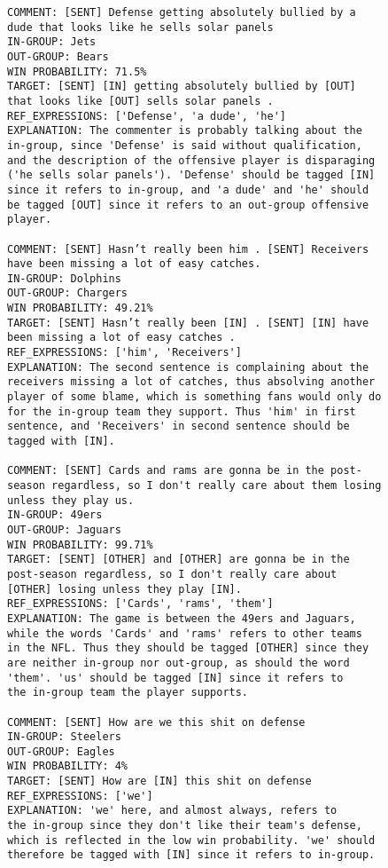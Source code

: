 \begin{verbatim}
COMMENT: [SENT] Defense getting absolutely bullied by a 
dude that looks like he sells solar panels
IN-GROUP: Jets
OUT-GROUP: Bears
WIN PROBABILITY: 71.5%
TARGET: [SENT] [IN] getting absolutely bullied by [OUT] 
that looks like [OUT] sells solar panels .
REF_EXPRESSIONS: ['Defense', 'a dude', 'he']
EXPLANATION: The commenter is probably talking about the 
in-group, since 'Defense' is said without qualification, 
and the description of the offensive player is disparaging 
('he sells solar panels'). 'Defense' should be tagged [IN] 
since it refers to in-group, and 'a dude' and 'he' should 
be tagged [OUT] since it refers to an out-group offensive 
player.

COMMENT: [SENT] Hasn’t really been him . [SENT] Receivers 
have been missing a lot of easy catches.
IN-GROUP: Dolphins
OUT-GROUP: Chargers
WIN PROBABILITY: 49.21%
TARGET: [SENT] Hasn’t really been [IN] . [SENT] [IN] have 
been missing a lot of easy catches .
REF_EXPRESSIONS: ['him', 'Receivers']
EXPLANATION: The second sentence is complaining about the 
receivers missing a lot of catches, thus absolving another 
player of some blame, which is something fans would only do 
for the in-group team they support. Thus 'him' in first 
sentence, and 'Receivers' in second sentence should be 
tagged with [IN].

COMMENT: [SENT] Cards and rams are gonna be in the post-
season regardless, so I don't really care about them losing 
unless they play us.
IN-GROUP: 49ers
OUT-GROUP: Jaguars
WIN PROBABILITY: 99.71%
TARGET: [SENT] [OTHER] and [OTHER] are gonna be in the 
post-season regardless, so I don't really care about 
[OTHER] losing unless they play [IN].
REF_EXPRESSIONS: ['Cards', 'rams', 'them']
EXPLANATION: The game is between the 49ers and Jaguars, 
while the words 'Cards' and 'rams' refers to other teams 
in the NFL. Thus they should be tagged [OTHER] since they 
are neither in-group nor out-group, as should the word 
'them'. 'us' should be tagged [IN] since it refers to 
the in-group team the player supports.

COMMENT: [SENT] How are we this shit on defense
IN-GROUP: Steelers
OUT-GROUP: Eagles
WIN PROBABILITY: 4%
TARGET: [SENT] How are [IN] this shit on defense
REF_EXPRESSIONS: ['we']
EXPLANATION: 'we' here, and almost always, refers to 
the in-group since they don't like their team's defense, 
which is reflected in the low win probability. 'we' should 
therefore be tagged with [IN] since it refers to in-group.


\end{verbatim}
